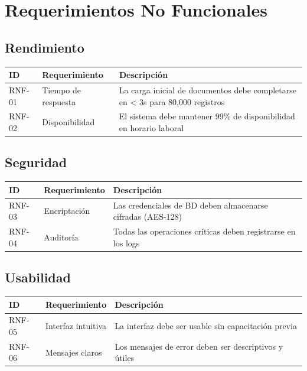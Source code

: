\section{Requerimientos No Funcionales}

\subsection{Rendimiento}

\begin{longtable}{|>{\raggedright\arraybackslash}p{2cm}|>{\raggedright\arraybackslash}p{4cm}|>{\raggedright\arraybackslash}p{8cm}|}
\hline
\textbf{ID} & \textbf{Requerimiento} & \textbf{Descripción} \\
\hline
RNF-01 & Tiempo de respuesta & La carga inicial de documentos debe completarse en < 3s para 80,000 registros \\
\hline
RNF-02 & Disponibilidad & El sistema debe mantener 99\% de disponibilidad en horario laboral \\
\hline
\end{longtable}

\subsection{Seguridad}

\begin{longtable}{|>{\raggedright\arraybackslash}p{2cm}|>{\raggedright\arraybackslash}p{4cm}|>{\raggedright\arraybackslash}p{8cm}|}
\hline
\textbf{ID} & \textbf{Requerimiento} & \textbf{Descripción} \\
\hline
RNF-03 & Encriptación & Las credenciales de BD deben almacenarse cifradas (AES-128) \\
\hline
RNF-04 & Auditoría & Todas las operaciones críticas deben registrarse en los logs \\
\hline
\end{longtable}

\subsection{Usabilidad}

\begin{longtable}{|>{\raggedright\arraybackslash}p{2cm}|>{\raggedright\arraybackslash}p{4cm}|>{\raggedright\arraybackslash}p{8cm}|}
\hline
\textbf{ID} & \textbf{Requerimiento} & \textbf{Descripción} \\
\hline
RNF-05 & Interfaz intuitiva & La interfaz debe ser usable sin capacitación previa \\
\hline
RNF-06 & Mensajes claros & Los mensajes de error deben ser descriptivos y útiles \\
\hline
\end{longtable}

